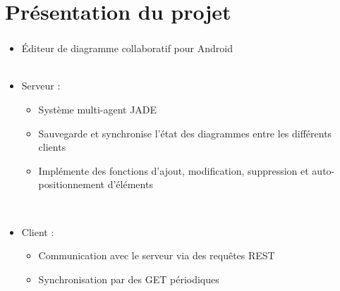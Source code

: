 \documentclass[11pt]{beamer}
\author{Jean Vintache\\Florian Impellettieri\\Charles Menier\\Marouane Hammi\\Adrien Jacquet}
\date{\today}
\begin{document}
\newcommand*{\ClipSep}{0.3cm}
\title{
		\hspace*{-.55cm}
}


\small

\begin{frame}
	\vspace{-0.75cm}
	\titlepage
\end{frame}


\section{Présentation du projet}
\begin{frame}
	\frametitle{\currentname}
	\begin{itemize}
		\item Éditeur de diagramme collaboratif pour Android
		\\~\\
		\item Serveur :
		\begin{itemize}
			\item Système multi-agent JADE
			\item Sauvegarde et synchronise l'état des diagrammes entre les différents clients
			\item Implémente des fonctions d'ajout, modification, suppression et auto-positionnement d'éléments
		\end{itemize}
		~\\
		\item Client :
		\begin{itemize}
			\item Communication avec le serveur via des requêtes REST
			\item Synchronisation par des GET périodiques
		\end{itemize}
	\end{itemize}
\end{frame}
\end{document}
